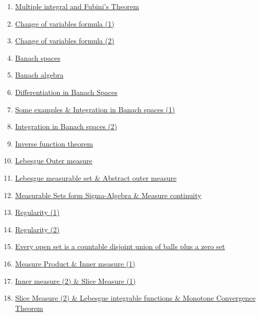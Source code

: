 \documentclass[11pt]{article}
\begin{document}
\begin{enumerate}
	\item 	\href{https://mp.weixin.qq.com/s/5Lrq2GqOxJuu2B268AuxlQ}{Multiple integral and Fubini’s Theorem}	%
	\item	\href{https://mp.weixin.qq.com/s/vG0ybcY3tLWhcAUNPtfFmw}{Change of variables formula (1)}	%
	\item	\href{https://mp.weixin.qq.com/s/aFb8lovr6X4caO3NNkWc4Q}{Change of variables formula (2)}	%
	\item	\href{https://mp.weixin.qq.com/s/TkN4d9Hla9-C_1o2VpvLXg}{Banach spaces} 	%
	\item 	\href{https://mp.weixin.qq.com/s/GF_PalPTEH7uFpzTMvFzXw}{Banach algebra}	%
	\item 	\href{https://mp.weixin.qq.com/s/bSUyP1ZBOypLaOCTX3abCA}{Differentiation in Banach Spaces}	%
	\item 	\href{https://mp.weixin.qq.com/s/4mhJzCdRBN11zi2Dy0SvuA}{Some examples \& Integration in Banach spaces (1)}	%
	\item 	\href{https://mp.weixin.qq.com/s/Lhk-fSknKiRoxcfiHYq86w}{Integration in Banach spaces (2)}	%
	\item 	\href{https://mp.weixin.qq.com/s/Z1-miHbarybT2ZR0NitX9A}{Inverse function theorem}	%
	\item 	\href{https://mp.weixin.qq.com/s/DoGy5Ua4i2c-z_vObYHO-Q}{Lebesgue Outer measure}	%
	\item 	\href{https://mp.weixin.qq.com/s/b8MljlQaD5a3mo872VB7-w}{Lebesgue measurable set \& Abstract outer measure}	%
	\item	\href{https://mp.weixin.qq.com/s/Dm26WpkdsaS4-kf88-pAqQ}{Measurable Sets form Sigma-Algebra \& Measure continuity}	%
	\item	\href{https://mp.weixin.qq.com/s/-v4McKbHcJa2a7K-7kjHPw}{Regularity (1)}	%
	\item	\href{https://mp.weixin.qq.com/s/sKGz15q_ODPhUum1d-5-ew}{Regularity (2)} 	%
	\item 	\href{https://mp.weixin.qq.com/s/QfF9wslg56szUqV5S9Ag4Q}{Every open set is a countable disjoint union of balls plus a zero set}	%
	\item 	\href{https://mp.weixin.qq.com/s/p7CfscjUPsxh4OCgwKjGiA}{Measure Product \& Inner measure (1)}	%
	\item 	\href{https://mp.weixin.qq.com/s/UdoUtutFqQ-akVsdmAttDg}{Inner measure (2) \& Slice Measure (1)}	%
	\item 	\href{https://mp.weixin.qq.com/s/2fK9z8rTUTzREvXB9ZUiVQ}{Slice Measure (2) \& Lebesgue integrable functions \& Monotone Convergence Theorem}	%

\end{enumerate}
\end{document}
